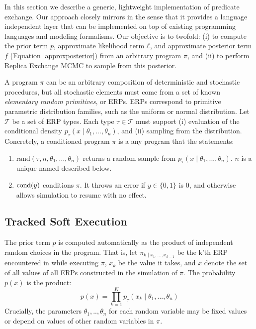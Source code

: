 

In this section we describe a generic, lightweight implementation of predicate exchange.
Our approach closely mirrors \citep{wingate2011lightweight, milch20071} in the sense that it provides a language independent layer that can be implemented on top of existing programming languages and modeling formalisms.
Our objective is to twofold: (i) to compute the prior term $p$, approximate likelihood term $\operatorname{\ell}$, and approximate posterior term $f$ (Equation \ref{approxposterior}) from an arbitrary program $\pi$, and (ii) to perform Replica Exchange MCMC to sample from this posterior.

A program $\pi$ can be an arbitrary composition of deterministic and stochastic procedures, but all stochastic elements must come from a set of known \emph{elementary random primitives}, or ERPs.
ERPs correspond to primitive parametric distribution families, such as the uniform or normal distribution.
Let $\mathcal{T}$ be a set of ERP types.
Each type $\tau \in \mathcal{T}$ must support (i) evaluation of the conditional density $p_\tau(x \mid \theta_1, ..., \theta_n)$, and (ii) sampling from the distribution.
Concretely, a conditioned program $\pi$ is a any program that the statements:

\begin{enumerate}
  \item $\textrm{rand}(\tau, n, \theta_1, ...,\theta_n)$ returns a random sample from $p_\tau(x \mid \theta_1, ..., \theta_n)$.  $n$ is a unique named described below.
  \item $\operatorname{cond}(y)$ conditions $\pi$.  It throws an error if $y \in \{0, 1\}$ is 0, and otherwise allows simulation to resume with no effect.
\end{enumerate}

\subsection{Tracked Soft Execution}
The prior term $p$ is computed automatically as the product of independent random choices in the program. 
That is, let $\pi_{k \mid x_1, ..., x_{k-1}}$ be the k'th ERP encountered in while executing $\pi$, $x_k$ be the value it takes, and $x$ denote the set of all values of all ERPs constructed in the simulation of $\pi$.
The probability $p(x)$ is the product:
\begin{equation}\label{productprob}
p(x) = \prod_{k=1}^K p_\tau(x_k \mid \theta_1,..., \theta_n )
\end{equation}
Crucially, the parameters $\theta_1,..,\theta_n$ for each random variable may be fixed values or depend on values of other random variables in $\pi$.

